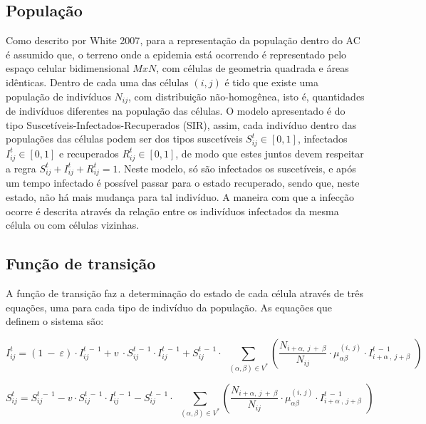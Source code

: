 \documentclass[a4paper,12pt]{article}
\begin{document}
\subsection{População}
Como descrito por White 2007\cite{White2007}, para a representação da população dentro do AC é assumido que, o terreno onde a epidemia está ocorrendo é representado pelo espaço celular bidimensional $MxN$, com células de geometria quadrada e áreas idênticas. Dentro de cada uma das células $(i,j)$ é tido que existe uma população de indivíduos $N_{ij}$, com distribuição não-homogênea, isto é, quantidades de indivíduos diferentes na população das células. O modelo apresentado é do tipo Suscetíveis-Infectados-Recuperados (SIR), assim, cada indivíduo dentro das populações das células podem ser dos tipos suscetíveis $S_{ij}^t \in [0, 1]$, infectados $I_{ij}^t \in [0, 1]$ e recuperados $R_{ij}^t \in [0, 1]$, de modo que estes juntos devem respeitar a regra $S_{ij}^t + I_{ij}^t + R_{ij}^t = 1$. Neste modelo, só são infectados os suscetíveis, e após um tempo infectado é possível passar para o estado recuperado, sendo que, neste estado, não há mais mudança para tal indivíduo. A maneira com que a infecção ocorre é descrita através da relação entre os indivíduos infectados da mesma célula ou com células vizinhas. 

\subsection{Função de transição}

A função de transição faz a determinação do estado de cada célula através de três equações, uma para cada tipo de indivíduo da população. As equações que definem o sistema são:

\begin{equation} 
I_{ij}^t=\left(1\:-\:\varepsilon \right)\cdot I_{ij}^{t\:-\:1}+v\:\cdot S_{ij}^{t\:-\:1}\cdot I_{ij}^{t\:-\:1}+S_{ij}^{t\:-\:1}\cdot \:\displaystyle \:\sum _{\left(\alpha ,\beta \right)\in V^{\ast }}^{ }\left(\frac{N_{i+\alpha ,\:j\:+\:\beta }}{N_{ij}}\cdot \mu _{\alpha \beta }^{\left(i,\:j\right)}\cdot I_{i+\alpha \:,\:j+\beta \:}^{t\:-\:1}\:\right)
\label{eq1}
\end{equation}

\begin{equation}
S_{ij}^t=S_{ij}^{t\:-\:1}-v\cdot S_{ij}^{t\:-\:1}\cdot I_{ij}^{t\:-\:1}-S_{ij}^{t\:-\:1}\cdot \:\displaystyle \:\sum _{\left(\alpha ,\beta \right)\in V^{\ast }}^{ }\left(\frac{N_{i+\alpha ,\:j\:+\:\beta }}{N_{ij}}\cdot \mu _{\alpha \beta }^{\left(i,\:j\right)}\cdot I_{i+\alpha \:,\:j+\beta \:}^{t\:-\:1}\:\right)
\label{eq2}
\end{equation}
\end{document}
